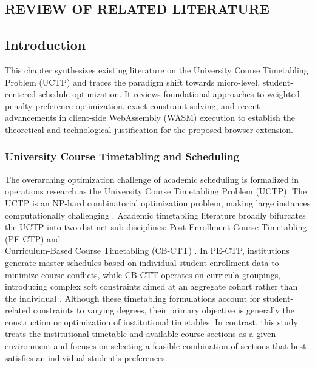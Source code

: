 \documentclass{icsthesis}
\begin{document}
\begin{mainmatter}
		
		\section{REVIEW OF RELATED LITERATURE}
		
		\subsection{Introduction}
		
		This chapter synthesizes existing literature on the University Course Timetabling Problem (UCTP) and traces the paradigm shift towards micro-level, student-centered schedule optimization. It reviews foundational approaches to weighted-penalty preference optimization, exact constraint solving, and recent advancements in client-side WebAssembly (WASM) execution to establish the theoretical and technological justification for the proposed browser extension.
		
		\subsubsection{University Course Timetabling and Scheduling}
		The overarching optimization challenge of academic scheduling is formalized in operations research as the University Course Timetabling Problem (UCTP). The UCTP is an NP-hard combinatorial optimization problem, making large instances computationally challenging \citep{cooper1996}. Academic timetabling literature broadly bifurcates the UCTP into two distinct sub-disciplines: Post-Enrollment Course Timetabling (PE-CTP) and \\Curriculum-Based Course Timetabling (CB-CTT) \citep{meier2026}. In PE-CTP, institutions generate master schedules based on individual student enrollment data to minimize course conflicts, while CB-CTT operates on curricula groupings, introducing complex soft constraints aimed at an aggregate cohort rather than the individual \citep{chen2013, han2025}. Although these timetabling formulations account for student-related constraints to varying degrees, their primary objective is generally the construction or optimization of institutional timetables. In contrast, this study treats the institutional timetable and available course sections as a given environment and focuses on selecting a feasible combination of sections that best satisfies an individual student's preferences.
		

\end{mainmatter}
\end{document}

